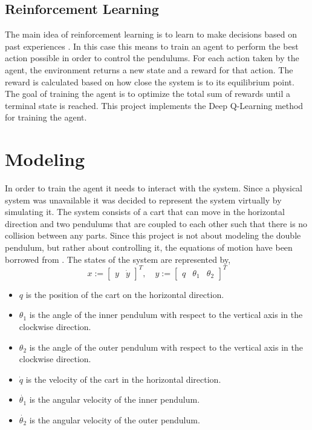 \documentclass[final]{LTHtwocol} %
\begin{document}
\subsection{Reinforcement Learning}
The main idea of reinforcement learning is to learn to make decisions based on past experiences \cite{Sutton_Barto}.
In this case this means to train an agent to perform the best action possible in order to control the pendulums.
For each action taken by the agent, the environment returns a new state and a reward for that action.
The reward is calculated based on how close the system is to its equilibrium point.
The goal of training the agent is to optimize the total sum of rewards until a terminal state is reached.
This project implements the Deep Q-Learning \cite{Deep_Q_Learning_First} method for training the agent.


\section{Modeling}
In order to train the agent it needs to interact with the system.
Since a physical system was unavailable it was decided to represent the system virtually by simulating it.
The system consists of a cart that can move in the horizontal direction and two pendulums that are coupled to each other such that there is no collision between any parts.
Since this project is not about modeling the double pendulum, but rather about controlling it, the equations of motion have been borrowed from \cite{Double_Pendulum_Equations}.
The states of the system are represented by,
\begin{equation}
x  :=
\begin{bmatrix}
y & \dot{y}
\end{bmatrix}
^T , \quad y :=
\begin{bmatrix}
q & \theta_1 & \theta_2
\end{bmatrix}
^T
\end{equation}
\begin{itemize}
\item $q$ is the position of the cart on the horizontal direction.
\item $\theta_1$ is the angle of the inner pendulum with respect to the vertical axis in the clockwise direction.
\item $\theta_2$ is the angle of the outer pendulum with respect to the vertical axis in the clockwise direction.
\item $\dot{q}$ is the velocity of the cart in the horizontal direction.
\item $\dot{\theta_1}$ is the angular velocity of the inner pendulum.
\item $\dot{\theta_2}$ is the angular velocity of the outer pendulum.
\end{itemize}
\end{document}

